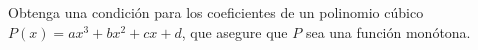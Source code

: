 \item Obtenga una condición para los coeficientes de un polinomio cúbico $P(x) = ax^3 + bx^2 + cx + d$, que asegure que $P$ sea una función monótona.
